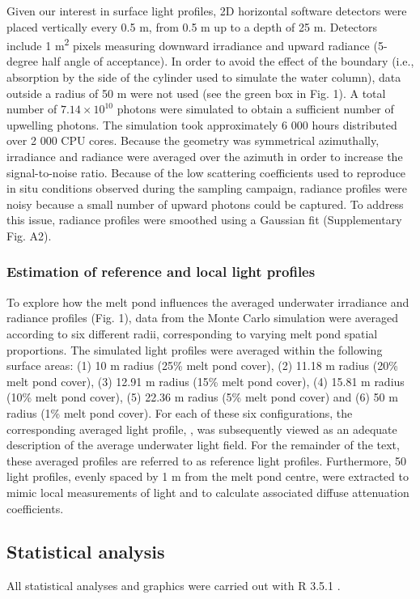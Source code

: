 Given our interest in surface light profiles, 2D horizontal software detectors were placed vertically every 0.5 m, from 0.5 m up to a depth of 25 m. Detectors include 1 m\textsuperscript{2} pixels measuring downward irradiance and upward radiance (5-degree half angle of acceptance). In order to avoid the effect of the boundary (i.e., absorption by the side of the cylinder used to simulate the water column), data outside a radius of 50 m were not used (see the green box in Fig. 1). A total number of $7.14 \times 10^{10}$ photons were simulated to obtain a sufficient number of upwelling photons. The simulation took approximately 6 000 hours distributed over 2 000 CPU cores. Because the geometry was symmetrical azimuthally, irradiance and radiance were averaged over the azimuth in order to increase the signal-to-noise ratio. Because of the low scattering coefficients used to reproduce in situ conditions observed during the sampling campaign, radiance profiles were noisy because a small number of upward photons could be captured. To address this issue, radiance profiles were smoothed using a Gaussian fit (Supplementary Fig. A2). 

\subsubsection{Estimation of reference and local light profiles}

To explore how the melt pond influences the averaged underwater irradiance and radiance profiles (Fig. 1), data from the Monte Carlo simulation were averaged according to six different radii, corresponding to varying melt pond spatial proportions. The simulated light profiles were averaged within the following surface areas: (1) 10 m radius (25\% melt pond cover), (2) 11.18 m radius (20\% melt pond cover), (3) 12.91 m radius (15\% melt pond cover), (4) 15.81 m radius (10\% melt pond cover), (5) 22.36 m radius (5\% melt pond cover) and (6) 50 m radius (1\% melt pond cover). For each of these six configurations, the corresponding averaged light profile, \meanedz{}, was subsequently viewed as an adequate description of the average underwater light field. For the remainder of the text, these averaged profiles are referred to as reference light profiles. Furthermore, 50 light profiles, evenly spaced by 1 m from the melt pond centre, were extracted to mimic local measurements of light and to calculate associated diffuse attenuation coefficients.

\subsection{Statistical analysis}

All statistical analyses and graphics were carried out with R 3.5.1 \citep{RCoreTeam2018}. 